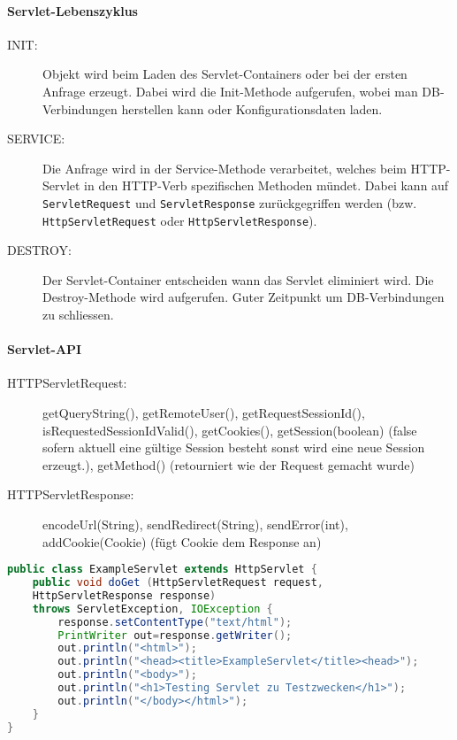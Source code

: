 \paragraph{Servlet-Lebenszyklus}
\begin{description}
	\item[INIT:] Objekt wird beim Laden des Servlet-Containers oder bei der ersten Anfrage erzeugt. Dabei wird die Init-Methode aufgerufen, wobei man DB-Verbindungen herstellen kann oder Konfigurationsdaten laden.
	\item[SERVICE:] Die Anfrage wird in der Service-Methode verarbeitet, welches beim HTTP-Servlet in den HTTP-Verb spezifischen Methoden mündet. Dabei kann auf \verb|ServletRequest| und \verb|ServletResponse| zurückgegriffen werden (bzw. \verb|HttpServletRequest| oder \verb|HttpServletResponse|).
	\item[DESTROY:] Der Servlet-Container entscheiden wann das Servlet eliminiert wird. Die Destroy-Methode wird aufgerufen. Guter Zeitpunkt um DB-Verbindungen zu schliessen.
\end{description}

\paragraph{Servlet-API}
\begin{description}
	\item[HTTPServletRequest:] getQueryString(), getRemoteUser(), getRequestSessionId(), isRequestedSessionIdValid(), getCookies(), getSession(boolean) (false sofern aktuell eine gültige Session besteht sonst wird eine neue Session erzeugt.),  getMethod() (retourniert wie der Request gemacht wurde)
	\item[HTTPServletResponse:]	encodeUrl(String), sendRedirect(String), sendError(int), addCookie(Cookie) (fügt Cookie dem Response an)
\end{description}

\begin{lstlisting}[language=Java, caption=Servlet Sample]
public class ExampleServlet extends HttpServlet {
	public void doGet (HttpServletRequest request,
	HttpServletResponse response)
	throws ServletException, IOException {
		response.setContentType("text/html");
		PrintWriter out=response.getWriter();
		out.println("<html>");
		out.println("<head><title>ExampleServlet</title><head>");
		out.println("<body>");
		out.println("<h1>Testing Servlet zu Testzwecken</h1>");
		out.println("</body></html>");
	}
}
\end{lstlisting}

